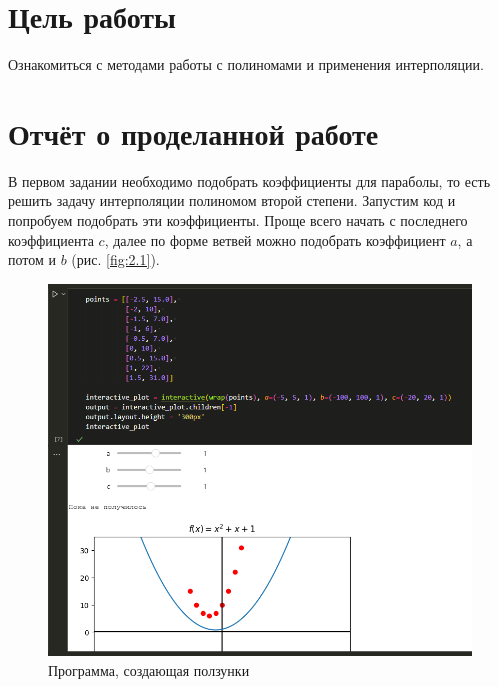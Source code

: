 \documentclass[14pt,a4paper]{extarticle}
\begin{document}


\section*{Цель работы}
    Ознакомиться с методами работы с полиномами и применения
интерполяции.

\section*{Отчёт о проделанной работе}
        В первом задании необходимо подобрать коэффициенты для параболы,
то есть решить задачу интерполяции полиномом второй степени. Запустим код
и попробуем подобрать эти коэффициенты. Проще всего начать с последнего
коэффициента $c$, далее по форме ветвей можно подобрать коэффициент $a$, а
потом и $b$ (рис. \ref{fig:2.1}).

\begin{figure}[h!]
    \centering
    \includegraphics[width=0.4\linewidth]{figures/2.1.png}
    \caption{Программа, создающая ползунки}
    \label{fig:2.1-interactive}
\end{figure}
\end{document}
